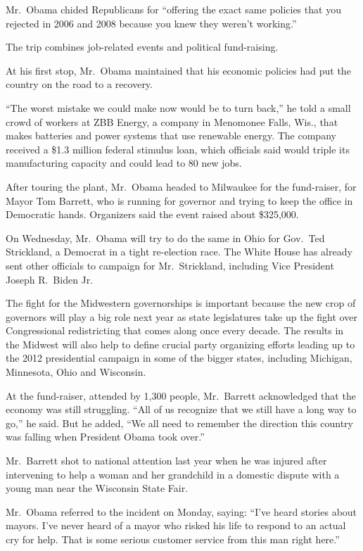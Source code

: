 ﻿\documentclass[12pt]{article}
\begin{document}
Mr.~Obama chided Republicans for ``offering the exact same policies that you rejected in 2006 and
2008 because you knew they weren't working.''

The trip combines job-related events and political fund-raising.

At his first stop, Mr.~Obama maintained that his economic policies had put the country on the road
to a recovery.

``The worst mistake we could make now would be to turn back,'' he told a small crowd of workers at
ZBB Energy, a company in Menomonee Falls, Wis., that makes batteries and power systems that use
renewable energy. The company received a \$1.3 million federal stimulus loan, which officials said
would triple its manufacturing capacity and could lead to 80 new jobs.

After touring the plant, Mr.~Obama headed to Milwaukee for the fund-raiser, for Mayor Tom Barrett,
who is running for governor and trying to keep the office in Democratic hands. Organizers said the
event raised about \$325,000.

On Wednesday, Mr.~Obama will try to do the same in Ohio for Gov.~Ted Strickland, a Democrat in a
tight re-election race. The White House has already sent other officials to campaign for
Mr.~Strickland, including Vice President Joseph R.~Biden Jr.

The fight for the Midwestern governorships is important because the new crop of governors will play
a big role next year as state legislatures take up the fight over Congressional redistricting that
comes along once every decade. The results in the Midwest will also help to define crucial party
organizing efforts leading up to the 2012 presidential campaign in some of the bigger states,
including Michigan, Minnesota, Ohio and Wisconsin.

At the fund-raiser, attended by 1,300 people, Mr.~Barrett acknowledged that the economy was still
struggling. ``All of us recognize that we still have a long way to go,'' he said. But he added, ``We
all need to remember the direction this country was falling when President Obama took over.''

Mr.~Barrett shot to national attention last year when he was injured after intervening to help a
woman and her grandchild in a domestic dispute with a young man near the Wisconsin State Fair.

Mr.~Obama referred to the incident on Monday, saying: ``I've heard stories about mayors. I've never
heard of a mayor who risked his life to respond to an actual cry for help. That is some serious
customer service from this man right here.''
\end{document}
